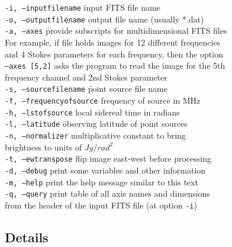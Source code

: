 \documentclass[letterpaper, twoside, 12pt]{article}
\begin{document}
\begin{tabbing}
{\tt-i, --inputfilename} \hspace{10mm} \= input FITS file name \\
{\tt-o, --outputfilename} \> output file name (usually *.dat) \\
{\tt-a, --axes} \hspace{5mm} \= provide subscripts for multidimensional FITS files \\ 
\>For example, if file holds images for 12 different frequencies \\
\>and 4 Stokes parameters for each frequency, then the option \\
\> {\tt--axes [5,2]} asks the program to read the image for the 5th \\
\> frequency channel and 2nd Stokes parameter \\
{\tt-s, --sourcefilename} \hspace{6mm} \= point source file name \\
{\tt-f, --frequencyofsource} \> frequency of source in MHz    \\
{\tt-h, --lstofsource} \> local sidereal time in radians\\
{\tt-l, --latitude} \hspace{6mm} \= observing latitude of point sources\\
{\tt-n, --normalizer} \> multiplicative constant to bring \\
		\> brightness to units of $Jy/rad^2$ \\
{\tt-t, --ewtranspose} \> flip image east-west before processing\\
{\tt-d, --debug} \> print some variables and other information	\\
{\tt-m, --help} \> print the help message similar to this text \\
{\tt-q, --query} \> print table of all axis names and dimensions \\
 \>from the header of the input FITS file (at option {\tt-i}) \\
\end{tabbing}

\subsection*{Details}
\end{document}
